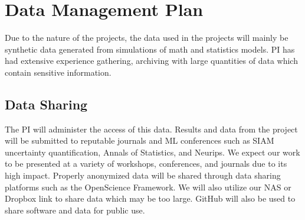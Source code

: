 \section*{Data Management Plan}

Due to the nature of the projects, the data used in the projects will mainly be synthetic data generated from simulations of math and statistics models.
PI has had extensive experience gathering, archiving with large quantities of data which contain sensitive information. 


\subsection*{Data Sharing}
The PI will administer the access of this data. 
% 
Results and data from the project will be submitted to reputable journals and ML conferences such as SIAM uncertainty quantification, Annals of Statistics, and Neurips. We expect our work to be presented at a variety of workshops, conferences, and journals due to its high impact. Properly anonymized data will be shared through data sharing platforms such as the OpenScience Framework. We will also utilize our NAS or Dropbox link to share data which may be too large. GitHub will also be used to share software and data for public use. 
